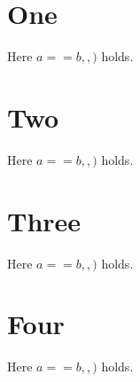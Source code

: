 \documentclass{article}
\begin{document}
\section{One}
Here $a = = b ,, )$ holds.
\section{Two}
Here $a = = b ,, )$ holds.
\section{Three}
Here $a = = b ,, )$ holds.
\section{Four}
Here $a = = b ,, )$ holds.
\end{document}
